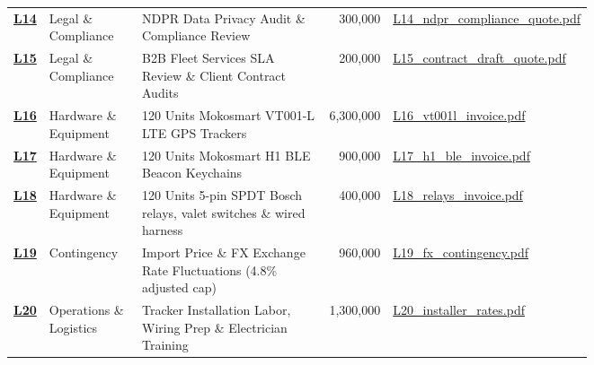 \documentclass[11pt,a4paper]{article}
\begin{document}
{\begin{longtable}{p{0.05\linewidth} p{0.16\linewidth} p{0.32\linewidth} r p{0.22\linewidth}}
    \href{https://drive.google.com/drive/folders/safebox_window1_evidence/L14_ndpr_compliance_quote.pdf}{\textbf{L14}} & Legal \& Compliance & NDPR Data Privacy Audit \& Compliance Review & 300,000 & \href{https://drive.google.com/drive/folders/safebox_window1_evidence/L14_ndpr_compliance_quote.pdf}{L14\_ndpr\_compliance\_quote.pdf} \\
    \href{https://drive.google.com/drive/folders/safebox_window1_evidence/L15_contract_draft_quote.pdf}{\textbf{L15}} & Legal \& Compliance & B2B Fleet Services SLA Review \& Client Contract Audits & 200,000 & \href{https://drive.google.com/drive/folders/safebox_window1_evidence/L15_contract_draft_quote.pdf}{L15\_contract\_draft\_quote.pdf} \\
    \href{https://drive.google.com/drive/folders/safebox_window1_evidence/L16_vt001l_invoice.pdf}{\textbf{L16}} & Hardware \& Equipment & 120 Units Mokosmart VT001-L LTE GPS Trackers & 6,300,000 & \href{https://drive.google.com/drive/folders/safebox_window1_evidence/L16_vt001l_invoice.pdf}{L16\_vt001l\_invoice.pdf} \\
    \href{https://drive.google.com/drive/folders/safebox_window1_evidence/L17_h1_ble_invoice.pdf}{\textbf{L17}} & Hardware \& Equipment & 120 Units Mokosmart H1 BLE Beacon Keychains & 900,000 & \href{https://drive.google.com/drive/folders/safebox_window1_evidence/L17_h1_ble_invoice.pdf}{L17\_h1\_ble\_invoice.pdf} \\
    \href{https://drive.google.com/drive/folders/safebox_window1_evidence/L18_relays_invoice.pdf}{\textbf{L18}} & Hardware \& Equipment & 120 Units 5-pin SPDT Bosch relays, valet switches \& wired harness & 400,000 & \href{https://drive.google.com/drive/folders/safebox_window1_evidence/L18_relays_invoice.pdf}{L18\_relays\_invoice.pdf} \\
    \href{https://drive.google.com/drive/folders/safebox_window1_evidence/L19_fx_contingency.pdf}{\textbf{L19}} & Contingency & Import Price \& FX Exchange Rate Fluctuations (4.8\% adjusted cap) & 960,000 & \href{https://drive.google.com/drive/folders/safebox_window1_evidence/L19_fx_contingency.pdf}{L19\_fx\_contingency.pdf} \\
    \href{https://drive.google.com/drive/folders/safebox_window1_evidence/L20_installer_rates.pdf}{\textbf{L20}} & Operations \& Logistics & Tracker Installation Labor, Wiring Prep \& Electrician Training & 1,300,000 & \href{https://drive.google.com/drive/folders/safebox_window1_evidence/L20_installer_rates.pdf}{L20\_installer\_rates.pdf} \\

\end{longtable}}
\end{document}
